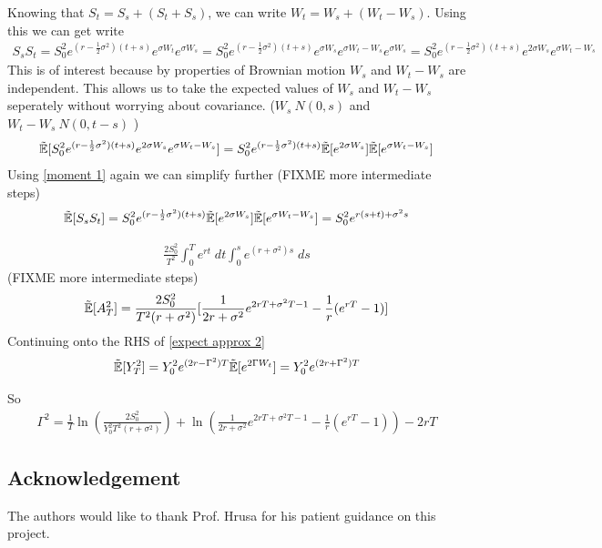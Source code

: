 \documentclass[reqno]{amsart}
\newcommand{\rE}[1]{\tilde{\E}[#1]}
\begin{document}
Knowing that $S_t = S_s + (S_t + S_s)$, we can write $W_t = W_s + (W_t - W_s)$. Using this we can get write
\begin{align}
     S_{s} S_{t} 
     = S_0^2 e^{(r-\frac{1}{2}\sigma^2)(t+s)} e^{\sigma W_t} e^{\sigma W_s}
     = S_0^2 e^{(r-\frac{1}{2}\sigma^2)(t+s)} e^{\sigma W_s} e^{\sigma W_t - W_s} e^{\sigma W_s}
     = S_0^2 e^{(r-\frac{1}{2}\sigma^2)(t+s)} e^{2 \sigma W_s} e^{\sigma W_t - W_s}
\end{align}
This is of interest because by properties of Brownian motion $W_s$ and $W_t - W_s$ are independent.
This allows us to take the expected values of $W_s$ and $W_t - W_s$ seperately without worrying about covariance.
($W_s ~ N(0,s)$ and $W_t - W_s ~ N(0,t-s)$ )
\begin{align}
     \rE{S_0^2 e^{(r-\frac{1}{2}\sigma^2)(t+s)}e^{2 \sigma W_s} e^{\sigma W_t - W_s}}
     = S_0^2 e^{(r-\frac{1}{2}\sigma^2)(t+s)} \rE{e^{2 \sigma W_s}} \rE{e^{\sigma W_t - W_s}}
\end{align}
Using \eqref{moment 1} again we can simplify further (FIXME more intermediate steps)
\begin{align}
     \rE{S_{s} S_{t}} 
     = S_0^2 e^{(r-\frac{1}{2}\sigma^2)(t+s)} \rE{e^{2 \sigma W_s}} \rE{e^{\sigma W_t - W_s}}
     = S_0^2 e^{r(s+t)+\sigma^2s}
\end{align}

\begin{align}
     \frac{2S_0^2}{T^2} \int_0^T e^{rt} \; dt \int_0^s e^{(r+\sigma^2)s} \; ds 
\end{align}
(FIXME more intermediate steps)
\begin{align}
     \rE{A_T^2} =  
     \frac{2S_0^2}{T^2(r+\sigma^2)}[\frac{1}{2r+\sigma^2}e^{2rT+\sigma^2T-1}-\frac{1}{r}(e^{rT}-1)]
\end{align}
Continuing onto the RHS of  \eqref{expect approx 2}
\begin{align}
     \rE{Y_T^2}
     = Y_0^2 e^{(2r-\Gamma^2)T} \rE{e^{2\Gamma W_t}}
     = Y_0^2 e^{(2r+\Gamma^2)T}
\end{align}

So
\begin{align}
     \Gamma^2
     = \frac{1}{T}\ln{(\frac{2S_0^2}{Y_0^2 T^2 (r+\sigma^2)})}+\ln{(\frac{1}{2r+\sigma^2}e^{2rT+\sigma^2T-1}-\frac{1}{r}(e^{rT}-1))} -2rT
\end{align}

\subsection*{Acknowledgement} The authors would like to thank Prof. Hrusa for his patient guidance on this project.  
\end{document}
